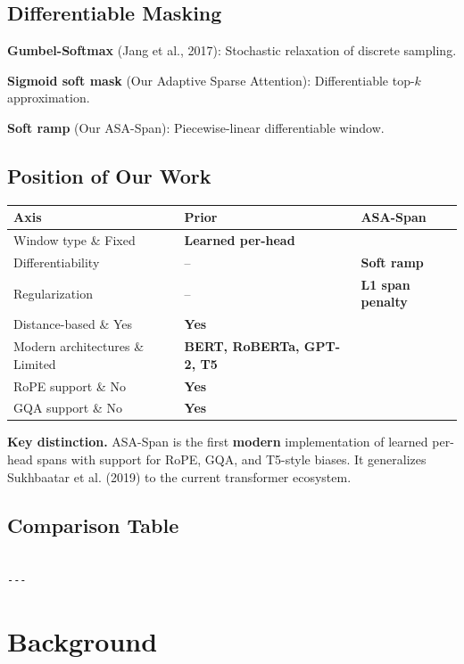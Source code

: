 \subsection{Differentiable Masking}

\textbf{Gumbel-Softmax} (Jang et al., 2017): Stochastic relaxation of discrete 
sampling.

\textbf{Sigmoid soft mask} (Our Adaptive Sparse Attention): Differentiable 
top-$k$ approximation.

\textbf{Soft ramp} (Our ASA-Span): Piecewise-linear differentiable window.

\subsection{Position of Our Work}

\begin{table}[H]
\centering
\small
\begin{tabular}{lll}
\toprule
\textbf{Axis} & \textbf{Prior} & \textbf{ASA-Span} \\
\midrule
Window type \& Fixed & \textbf{Learned per-head} \\
Differentiability & -- & \textbf{Soft ramp} \\
Regularization & -- & \textbf{L1 span penalty} \\
Distance-based \& Yes & \textbf{Yes} \\
Modern architectures \& Limited & \textbf{BERT, RoBERTa, GPT-2, T5} \\
RoPE support \& No & \textbf{Yes} \\
GQA support \& No & \textbf{Yes} \\
\bottomrule
\end{tabular}
\end{table}

\textbf{Key distinction.} ASA-Span is the first \textbf{modern} implementation of 
learned per-head spans with support for RoPE, GQA, and T5-style biases. It 
generalizes Sukhbaatar et al. (2019) to the current transformer ecosystem.

\subsection{Comparison Table}

\begin{lstlisting}

---
\end{lstlisting}


\section{Background}

